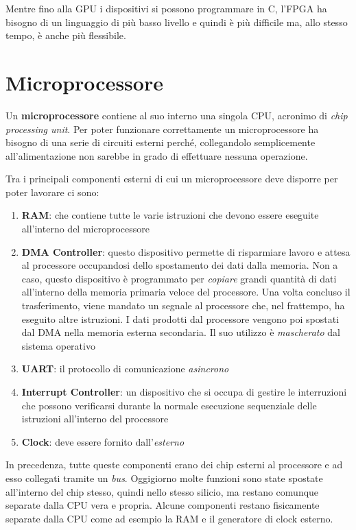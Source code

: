 \documentclass[12pt, a4paper]{report}
\begin{document}
Mentre fino alla GPU i dispositivi si possono programmare in C, l'FPGA ha bisogno di un linguaggio di più basso livello e quindi è più difficile ma, allo stesso tempo, è anche più flessibile.

\section{Microprocessore}
Un \textbf{microprocessore} contiene al suo interno una singola CPU, acronimo di \textit{chip processing unit}. Per poter funzionare correttamente un microprocessore ha bisogno di una serie di circuiti esterni perché, collegandolo semplicemente all'alimentazione non sarebbe in grado di effettuare nessuna operazione.

Tra i principali componenti esterni di cui un microprocessore deve disporre per poter lavorare ci sono:
\begin{enumerate}
    \item\textbf{RAM}: che contiene tutte le varie istruzioni che devono essere eseguite all'interno del microprocessore
    \item\textbf{DMA Controller}: questo dispositivo permette di risparmiare lavoro e attesa al processore occupandosi dello spostamento dei dati dalla memoria. Non a caso, questo dispositivo è programmato per \textit{copiare} grandi quantità di dati all'interno della memoria primaria veloce del processore. Una volta concluso il trasferimento, viene mandato un segnale al processore che, nel frattempo, ha eseguito altre istruzioni. I dati prodotti dal processore vengono poi spostati dal DMA nella memoria esterna secondaria. Il suo utilizzo è \textit{mascherato} dal sistema operativo
    \item\textbf{UART}: il protocollo di comunicazione \textit{asincrono}
    \item\textbf{Interrupt Controller}: un dispositivo che si occupa di gestire le interruzioni che possono verificarsi durante la normale esecuzione sequenziale delle istruzioni all'interno del processore
    \item\textbf{Clock}: deve essere fornito dall'\textit{esterno}
\end{enumerate}
In precedenza, tutte queste componenti erano dei chip esterni al processore e ad esso collegati tramite un \textit{bus}. Oggigiorno molte funzioni sono state spostate all'interno del chip stesso, quindi nello stesso silicio, ma restano comunque separate dalla CPU vera e propria. Alcune componenti restano fisicamente separate dalla CPU come ad esempio la RAM e il generatore di clock esterno.
\end{document}
